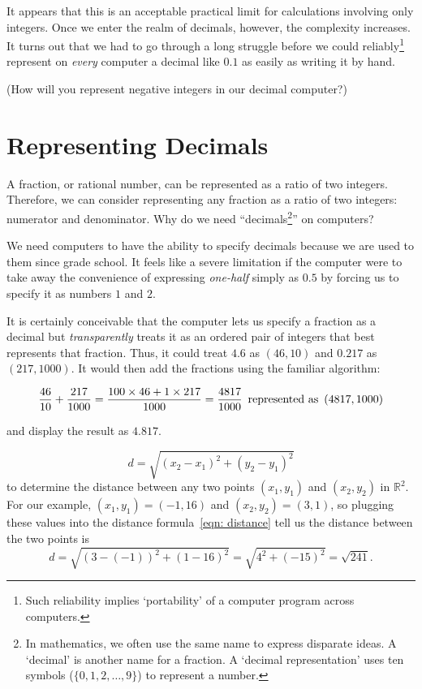 \documentclass[10pt]{article}         %
\begin{document}
It appears that this is an acceptable practical limit for calculations involving only integers. Once we enter the realm of decimals, however, the complexity increases. It turns out that we had to go through a long struggle before we could reliably\footnote{Such reliability implies `portability' of a computer program across computers.} represent on \textit{every} computer a decimal like $0.1$ as easily as writing it by hand.

{\small (How will you represent negative integers in our decimal computer?)}

\section{Representing Decimals}
\label{sec: decimals}
A fraction, or rational number, can be represented as a ratio of two integers. Therefore, we can consider representing any fraction as a ratio of two integers: numerator and denominator. Why do we need ``decimals\footnote{In mathematics, we often use the same name to express disparate ideas. A `decimal' is another name for a fraction. A `decimal representation' uses ten symbols ($\{0,1,2,\dots,9\}$) to represent a number.}'' on computers? 

We need computers to have the ability to specify decimals because we are used to them since grade school. It feels like a severe limitation if the computer were to take away the convenience of expressing \textit{one-half} simply as $0.5$ by forcing us to specify it as numbers $1$ and $2$.

It is certainly conceivable that the computer lets us specify a fraction as a decimal but \textit{transparently} treats it as an ordered pair of integers that best represents that fraction. Thus, it could treat $4.6$ as $(46,10)$ and $0.217$ as $(217,1000)$. It would then add the fractions using the familiar algorithm: 

$$\frac{46}{10} + \frac{217}{1000} = \frac{100\times 46 + 1\times 217}{1000} = \frac{4817}{1000} \text{\, represented as \,} (4817,1000) $$

and display the result as $4.817$.

\begin{equation}
\label{eqn: distance}
	d = \sqrt{(x_2 - x_1)^2 + (y_2 - y_1)^2}
\end{equation}
to determine the distance between any two points $(x_1, y_1)$ and $(x_2, y_2)$
in $\mathbb{R}^2$.  For our example, $(x_1, y_1) = (-1, 16)$ and $(x_2, y_2) =
(3, 1)$, so plugging these values into the distance formula~\eqref{eqn:
distance} tell us the distance between the two points is
$$
	d 
	= \sqrt{(3 - (-1))^2 + (1 - 16)^2}
	= \sqrt{4^2 + (-15)^2}
	= \sqrt{241}
	.
$$
\end{document}
